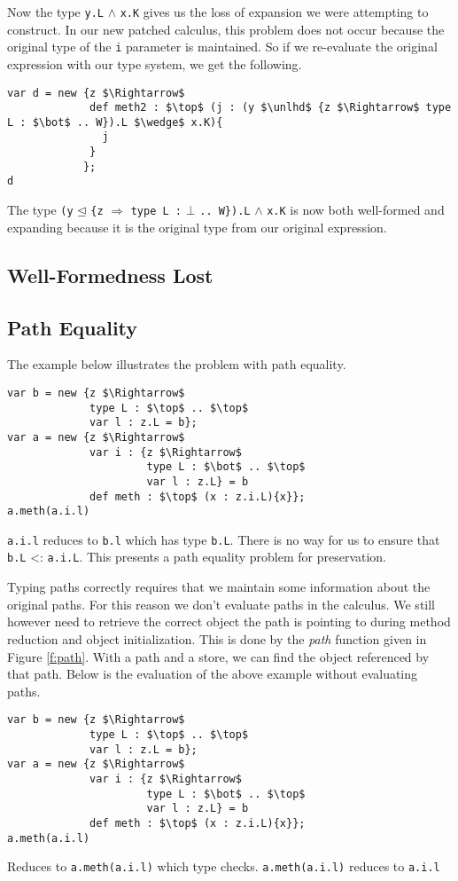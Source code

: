\documentclass{llncs}
\begin{document}
Now the type \texttt{y.L} $\wedge$ \texttt{x.K} gives us the loss of 
expansion we were attempting to construct. In our new patched calculus, 
this problem does not occur because the original type of the \texttt{i} 
parameter is maintained. So if we re-evaluate the original expression 
with our type system, we get the following.
\begin{lstlisting}[mathescape, style=custom_lang]
var d = new {z $\Rightarrow$
             def meth2 : $\top$ (j : (y $\unlhd$ {z $\Rightarrow$ type L : $\bot$ .. W}).L $\wedge$ x.K){
               j
             }
            };
d
\end{lstlisting}
The type \texttt{(y} $\unlhd$ \texttt{\{z} $\Rightarrow$ 
\texttt{type L :} $\bot$ \texttt{.. W\}).L} $\wedge$ \texttt{x.K} is now 
both well-formed and expanding because it is the original type 
from our original expression.



\subsection{Well-Formedness Lost}



\subsection{Path Equality}
\label{s:patheq}
The example below illustrates the problem with path equality.
\begin{lstlisting}[mathescape, style=custom_lang]
var b = new {z $\Rightarrow$
             type L : $\top$ .. $\top$
             var l : z.L = b};
var a = new {z $\Rightarrow$
             var i : {z $\Rightarrow$
                      type L : $\bot$ .. $\top$
                      var l : z.L} = b
             def meth : $\top$ (x : z.i.L){x}};
a.meth(a.i.l)
\end{lstlisting}
\texttt{a.i.l} reduces to \texttt{b.l} which has type \texttt{b.L}. 
There is no way for us to ensure that \texttt{b.L} <: \texttt{a.i.L}.
This presents a path equality problem for preservation.

Typing paths correctly requires that we maintain some information 
about the original paths. For this reason we don't evaluate paths 
in the calculus. We still however need to retrieve the correct object 
the path is pointing to during method reduction and object initialization. 
This is done by the \emph{path} function given in Figure \ref{f:path}. 
With a path and a store, we can find the object referenced by that path.
Below is the evaluation of the above example without evaluating paths.
\begin{lstlisting}[mathescape, style=custom_lang]
var b = new {z $\Rightarrow$
             type L : $\top$ .. $\top$
             var l : z.L = b};
var a = new {z $\Rightarrow$
             var i : {z $\Rightarrow$
                      type L : $\bot$ .. $\top$
                      var l : z.L} = b
             def meth : $\top$ (x : z.i.L){x}};
a.meth(a.i.l)
\end{lstlisting}
Reduces to \texttt{a.meth(a.i.l)} which type checks. \texttt{a.meth(a.i.l)}
reduces to \texttt{a.i.l}
\end{document}
